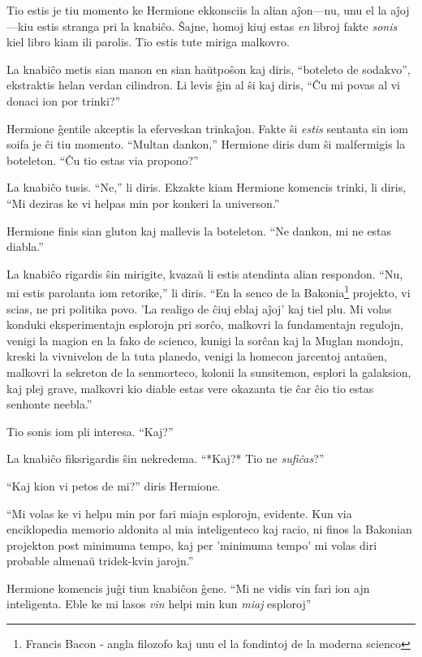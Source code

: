 Tio estis je tiu momento ke Hermione ekkonsciis la alian aĵon—nu, unu
el la aĵoj—kiu estis stranga pri la knabiĉo. Ŝajne, homoj kiuj estas
\emph{en} libroj fakte \emph{sonis} kiel libro kiam ili parolis. Tio
estis tute miriga malkovro.

La knabiĉo metis sian manon en sian haŭtpoŝon kaj diris, ``boteleto de
sodakvo'', ekstraktis helan verdan cilindron. Li levis ĝin al ŝi kaj
diris, ``Ĉu mi povas al vi donaci ion por trinki?''

Hermione ĝentile akceptis la eferveskan trinkaĵon. Fakte ŝi
\emph{estis} sentanta sin iom soifa je ĉi tiu momento. ``Multan
dankon,'' Hermione diris dum ŝi malfermigis la boteleton. ``Ĉu tio
estas via propono?''

La knabiĉo tusis. ``Ne,'' li diris. Ekzakte kiam Hermione komencis
trinki, li diris, ``Mi deziras ke vi helpas min por konkeri la
universon.''

Hermione finis sian gluton kaj mallevis la boteleton. ``Ne dankon, mi
ne estas diabla.''

La knabiĉo rigardis ŝin mirigite, kvazaŭ li estis atendinta alian
respondon. ``Nu, mi estis parolanta iom retorike,'' li diris. ``En la
senco de la Bakonia\footnote{Francis Bacon - angla filozofo kaj unu el
  la fondintoj de la moderna scienco} projekto, vi scias, ne pri
politika povo. 'La realigo de ĉiuj eblaj aĵoj' kaj tiel plu. Mi volas
konduki eksperimentajn esplorojn pri sorĉo, malkovri la fundamentajn
regulojn, venigi la magion en la fako de scienco, kunigi la sorĉan kaj
la Muglan mondojn, kreski la vivnivelon de la tuta planedo, venigi la
homecon jarcentoj antaŭen, malkovri la sekreton de la senmorteco,
kolonii la sunsitemon, esplori la galaksion, kaj plej grave, malkovri
kio diable estas vere okazanta tie ĉar ĉio tio estas senhonte
neebla.''

Tio sonis iom pli interesa. ``Kaj?''

La knabiĉo fiksrigardis ŝin nekredema. ``*Kaj?* Tio ne \emph{sufiĉas}?''

``Kaj kion vi petos de mi?'' diris Hermione.

``Mi volas ke vi helpu min por fari miajn esplorojn, evidente. Kun via
enciklopedia memorio aldonita al mia inteligenteco kaj racio, ni finos
la Bakonian projekton post minimuma tempo, kaj per 'minimuma tempo' mi
volas diri probable almenaŭ tridek-kvin jarojn.''

Hermione komencis juĝi tiun knabiĉon ĝene. ``Mi ne vidis vin fari ion
ajn inteligenta. Eble ke mi lasos \emph{vin} helpi min kun \emph{miaj}
esploroj''

